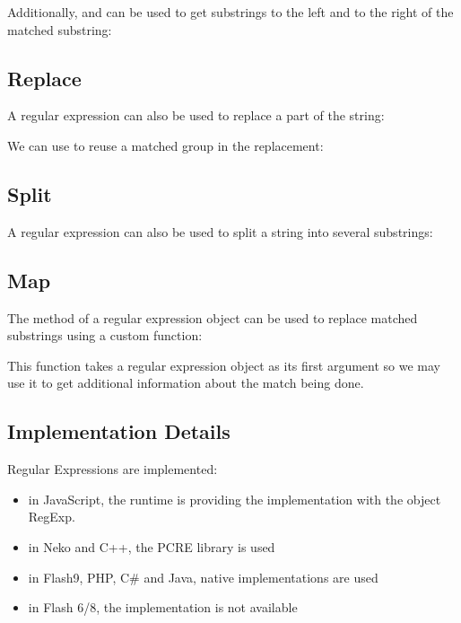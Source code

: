 \documentclass{haxe}
\begin{document}

Additionally,  and  can be used to get substrings to the left and to the right of the matched substring:


\subsection{Replace}
\label{std-regex-replace}

A regular expression can also be used to replace a part of the string:


We can use  to reuse a matched group in the replacement:


\subsection{Split}
\label{std-regex-split}

A regular expression can also be used to split a string into several substrings:


\subsection{Map}
\label{std-regex-map}

The  method of a regular expression object can be used to replace matched substrings using a custom function:


This function takes a regular expression object as its first argument so we may use it to get additional information about the match being done.

\subsection{Implementation Details}
\label{std-regex-implementation-details}

Regular Expressions are implemented:
\begin{itemize}
    \item in JavaScript, the runtime is providing the implementation with the object RegExp.
    \item in Neko and C++, the PCRE library is used
    \item in Flash9, PHP, C\# and Java, native implementations are used
    \item in Flash 6/8, the implementation is not available
\end{itemize}
\end{document}
